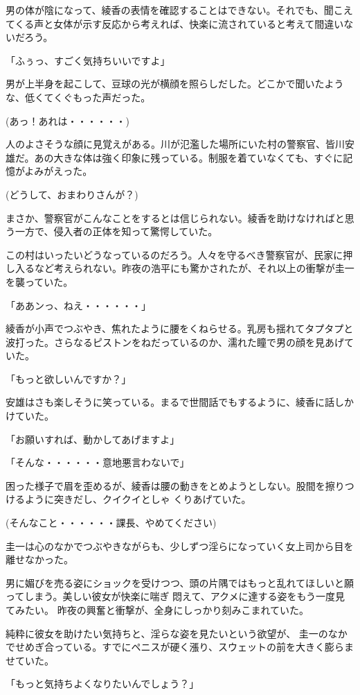 ﻿\documentclass[book,tate]{jlreq}
\begin{document}
男の体が陰になって、綾香の表情を確認することはできない。それでも、聞こえてくる声と女体が示す反応から考えれば、快楽に流されていると考えて間違いないだろう。

「ふぅっ、すごく気持ちいいですよ」

男が上半身を起こして、豆球の光が横顔を照らしだした。どこかで聞いたような、低くてくぐもった声だった。

(あっ！あれは・・・・・・)

人のよさそうな顔に見覚えがある。川が氾濫した場所にいた村の警察官、皆川安雄だ。あの大きな体は強く印象に残っている。制服を着ていなくても、すぐに記憶がよみがえった。

(どうして、おまわりさんが？)

まさか、警察官がこんなことをするとは信じられない。綾香を助けなければと思う一方で、侵入者の正体を知って驚愕していた。

この村はいったいどうなっているのだろう。人々を守るべき警察官が、民家に押し入るなど考えられない。昨夜の浩平にも驚かされたが、それ以上の衝撃が圭一を襲っていた。

「ああンっ、ねえ・・・・・・」

綾香が小声でつぶやき、焦れたように腰をくねらせる。乳房も揺れてタプタプと波打った。さらなるピストンをねだっているのか、濡れた瞳で男の顔を見あげていた。

「もっと欲しいんですか？」

安雄はさも楽しそうに笑っている。まるで世間話でもするように、綾香に話しかけていた。

「お願いすれば、動かしてあげますよ」

「そんな・・・・・・意地悪言わないで」

困った様子で眉を歪めるが、綾香は腰の動きをとめようとしない。股間を擦りつけるように突きだし、クイクイとしゃ くりあげていた。

(そんなこと・・・・・・課長、やめてください)

圭一は心のなかでつぶやきながらも、少しずつ淫らになっていく女上司から目を離せなかった。

男に媚びを売る姿にショックを受けつつ、頭の片隅ではもっと乱れてほしいと願ってしまう。美しい彼女が快楽に喘ぎ 悶えて、アクメに達する姿をもう一度見てみたい。 昨夜の興奮と衝撃が、全身にしっかり刻みこまれていた。

純粋に彼女を助けたい気持ちと、淫らな姿を見たいという欲望が、 圭一のなかでせめぎ合っている。すでにペニスが硬く漲り、スウェットの前を大きく膨らませていた。

「もっと気持ちよくなりたいんでしょう？」
\end{document}
